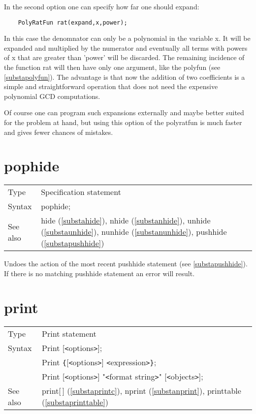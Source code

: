 \noindent In the second option one can specify how far one should expand:
\begin{verbatim}
    PolyRatFun rat(expand,x,power);
\end{verbatim}
In this case the denomnator can only be a polynomial in the variable x. It 
will be expanded and multiplied by the numerator and eventually all terms 
with powers of x that are greater than 'power' will be discarded. The 
remaining incidence of the function rat will then have only one argument, 
like the polyfun (see \ref{substapolyfun}). The advantage is that now the 
addition of two coefficients is a simple and straightforward operation that 
does not need the expensive polynomial GCD computations.

\noindent Of course one can program such expansions externally and maybe 
better suited for the problem at hand, but using this option of the 
polyratfun is much faster and gives fewer chances of mistakes.

\vspace{10mm}


\section{pophide}
\label{substapophide}

\noindent \begin{tabular}{ll}
Type & Specification statement\\
Syntax & pophide;
\\ See also & hide (\ref{substahide}),
              nhide (\ref{substanhide}),
              unhide (\ref{substaunhide}),
              nunhide (\ref{substanunhide}),
              pushhide (\ref{substapushhide})
\end{tabular} \vspace{4mm}

\noindent Undoes the action of the most recent 
pushhide statement (see \ref{substapushhide}). If there is 
no matching pushhide statement an error will result. \vspace{10mm}

 
\section{print}
\label{substaprint}

\noindent \begin{tabular}{ll}
Type & Print statement\\
Syntax & Print [{\tt<}options{\tt>}]; \\
       & Print \verb:{:[{\tt<}options{\tt>}] {\tt<}expression{\tt>}\verb:}:; \\
       & Print [{\tt<}options{\tt>}] "{\tt<}format string{\tt>}" [{\tt<}objects{\tt>}];
\\ See also & print[\,] (\ref{substaprintc}),
              nprint (\ref{substanprint}),
              printtable (\ref{substaprinttable})
\end{tabular}\vspace{4mm}

